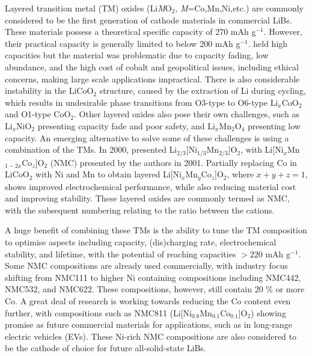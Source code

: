\documentclass[../main.tex]{subfiles}
\begin{document}
Layered transition metal (TM) oxides (Li\textit{M}O$_2$, \textit{M}=Co,Mn,Ni,etc.) are commonly considered to be the first generation of cathode materials in commercial LiBs. These materials possess a theoretical specific capacity of 270 mAh g$^{-1}$. However, their practical capacity is generally limited to below 200 mAh g$^{-1}$.\cite{myung2017nickel}  held high capacities but the material was problematic due to capacity fading, low abundance, and the high cost of cobalt and geopolitical issues, including ethical concerns, making large scale applications impractical. \cite{mo2018impact} There is also considerable instability in the LiCoO$_2$ structure, caused by the extraction of Li during cycling, which results in undesirable phase transitions from O3-type to O6-type Li$_x$CoO$_2$ and O1-type CoO$_2$. \cite{goonetilleke2018structural,chen2002staging} Other layered oxides also pose their own challenges, such as Li$_x$NiO$_2$ presenting capacity fade and poor safety, \cite{min2016comparative} and Li$_x$Mn$_2$O$_4$ presenting low capacity. \cite{tian2018performance} An emerging alternative to solve some of these challenges is using a combination of the TMs. In 2000, \citeauthor{paulsen2000o2} presented Li$_{2/3}$[Ni$_{1/3}$Mn$_{2/3}$]O$_2$, \cite{paulsen2000o2,paulsen20002} with Li[Ni$_x$Mn$_{1-2x}$Co$_z$]O$_2$ (NMC) presented by the authors in 2001. \cite{lu2001layered} Partially replacing Co in LiCoO$_2$ with Ni and Mn to obtain layered Li[Ni$_x$Mn$_y$Co$_z$]O$_2$, \cite{rozier2015li} where $x+y+z=1$, shows improved electrochemical performance, while also reducing material cost and improving stability.\cite{ohzuku2001layered} These layered oxides are commonly termed as NMC, with the subsequent numbering relating to the ratio between the cations.

A huge benefit of combining these TMs is the ability to tune the TM composition to optimise aspects including capacity, (dis)charging rate, electrochemical stability, and lifetime, with the potential of reaching capacities $>220$ mAh g$^{-1}$. \cite{duan2019insights} Some NMC compositions are already used commercially, with industry focus shifting from NMC111 to higher Ni containing compositions including NMC442, NMC532, and NMC622.\cite{zhang2018structural} These compositions, however, still contain 20 \% or more Co. A great deal of research is working towards reducing the Co content even further, with compositions such as NMC811 (Li[Ni$_{0.8}$Mn$_{0.1}$Co$_{0.1}$]O$_2$) showing promise as future commercial materials for applications, such as in long-range electric vehicles (EVs). \cite{azevedo2018mining} These Ni-rich NMC compositions are also considered to be the cathode of choice for future all-solid-state LiBs.\cite{myung2017nickel}
\end{document}
